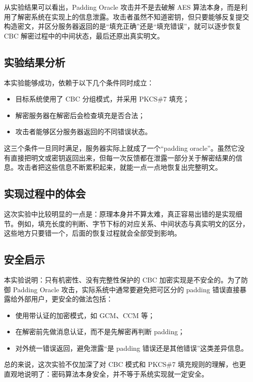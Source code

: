 从实验结果可以看出，Padding Oracle 攻击并不是去破解 AES 算法本身，而是利用了解密系统在实现上的信息泄露。攻击者虽然不知道密钥，但只要能够反复提交构造密文，并区分服务器返回的是“填充正确”还是“填充错误”，就可以逐步恢复 CBC 解密过程中的中间状态，最后还原出真实明文。

\subsection{实验结果分析}

本实验能够成功，依赖于以下几个条件同时成立：
\begin{itemize}
    \item 目标系统使用了 CBC 分组模式，并采用 PKCS\#7 填充；
    \item 解密服务器在解密后会检查填充是否合法；
    \item 攻击者能够区分服务器返回的不同错误状态。
\end{itemize}
这三个条件一旦同时满足，服务器实际上就成了一个“padding oracle”。虽然它没有直接把明文或密钥返回出来，但每一次反馈都在泄露一部分关于解密结果的信息。攻击者把这些信息不断累积起来，就能一点一点地恢复出完整明文。

\subsection{实现过程中的体会}

这次实验中比较明显的一点是：原理本身并不算太难，真正容易出错的是实现细节。例如，填充长度的判断、字节下标的对应关系、中间状态与真实明文的区分，这些地方只要错一个，后面的恢复过程就会全部受到影响。

\subsection{安全启示}

本实验说明：只有机密性、没有完整性保护的 CBC 加密实现是不安全的。为了防御 Padding Oracle 攻击，实际系统中通常要避免把可区分的 padding 错误直接暴露给外部用户，更安全的做法包括：
\begin{itemize}
    \item 使用带认证的加密模式，如 GCM、CCM 等；
    \item 在解密前先做消息认证，而不是先解密再判断 padding；
    \item 对外统一错误返回，避免泄露“是 padding 错误还是其他错误”这类差异信息。
\end{itemize}
总的来说，这次实验不仅加深了对 CBC 模式和 PKCS\#7 填充规则的理解，也更直观地说明了：密码算法本身安全，并不等于系统实现就一定安全。
